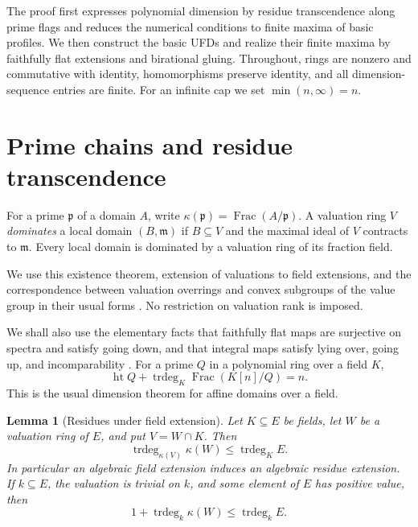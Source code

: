 \documentclass[11pt,reqno]{amsart}
\numberwithin{equation}{section}
\theoremstyle{plain}
\newtheorem{lemma}[theorem]{Lemma}
\theoremstyle{definition}
\theoremstyle{remark}
\begin{document}
The proof first expresses polynomial dimension by residue
transcendence along prime flags and reduces the numerical conditions
to finite maxima of basic profiles. We then construct the basic
UFDs and realize their finite maxima by faithfully flat extensions
and birational gluing.
Throughout, rings are nonzero and commutative with identity,
homomorphisms preserve identity, and all dimension-sequence entries
are finite. For an infinite cap we set \(\min(n,\infty)=n\).

\section{Prime chains and residue transcendence}
\label{sec:background}

For a prime \(\mathfrak p\) of a domain \(A\), write
\(\kappa(\mathfrak p)=\operatorname{Frac}(A/\mathfrak p)\).
A valuation ring \(V\) \emph{dominates} a local domain \((B,\mathfrak m)\)
if \(B\subseteq V\) and the maximal ideal of \(V\) contracts to
\(\mathfrak m\). Every local domain is dominated by a valuation ring
of its fraction field.

We use this existence theorem, extension of
valuations to field extensions, and the correspondence between valuation
overrings and convex subgroups of the value group in their usual forms
\cite[Ch.~VI]{BourbakiCA}. No restriction on valuation rank is imposed.

We shall also use the elementary facts that faithfully flat maps are
surjective on spectra and satisfy going down, and that integral maps
satisfy lying over, going up, and incomparability
\cite[Chs.~3, 5]{AtiyahMacdonald1969}. For a prime \(Q\) in a
polynomial ring over a field \(K\),
\begin{equation}\label{eq:field-height}
 \operatorname{ht}Q+\operatorname{trdeg}_K
       \operatorname{Frac}(K[n]/Q)=n.
\end{equation}
This is the usual dimension theorem for affine domains over a field.

\begin{lemma}[Residues under field extension]\label{lem:residue-extension}
Let \(K\subseteq E\) be fields, let \(W\) be a valuation ring of
\(E\), and put \(V=W\cap K\). Then
\begin{equation}\label{eq:residue-extension}
 \operatorname{trdeg}_{\kappa(V)}\kappa(W)
       \leq\operatorname{trdeg}_K E.
\end{equation}
In particular an algebraic field extension induces an algebraic residue
extension. If \(k\subseteq E\), the valuation is trivial on \(k\),
and some element of \(E\) has positive value, then
\begin{equation}\label{eq:positive-value-bound}
 1+\operatorname{trdeg}_k\kappa(W)
       \leq\operatorname{trdeg}_k E.
\end{equation}
\end{lemma}
\end{document}
